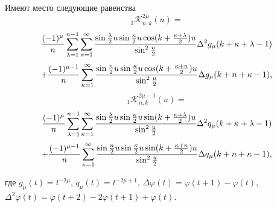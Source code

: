 \begin{lemma}\label{valle-pussen-l2.4} Имеют место следующие равенства
 $$
 _1\mathcal{ K}_{n,k}^{2\mu}(u)=
 $$
 $$
 {(-1)^\mu\over n}\sum\limits_{\lambda=1}^{n-1}
\sum\limits_{\kappa=1}^{\infty}\frac{\sin\frac{\lambda}{2}u\sin\frac{\kappa}{2}u
\cos(k+\frac{\kappa+\lambda}{2})u}{\sin^2\frac u2}\Delta^2g_\mu(k+\kappa+\lambda-1)
$$
 \begin{equation}\label{valle-pussen-2-2.23}
    +{(-1)^{\mu-1}\over n}\sum\limits_{\kappa=1}^{\infty}
\frac{\sin\frac {n}{2}u\sin\frac{\kappa}{2}u\cos(k+\frac{\kappa+n}{2})u}{\sin^2\frac u2}
\Delta g_\mu(k+n+\kappa-1),
 \end{equation}
 $$
 _1\mathcal{ K}_{n,k}^{2\mu-1}(u)=
 $$
 $$
 {(-1)^\mu\over n}\sum\limits_{\lambda=1}^{n-1}
\sum\limits_{\kappa=1}^{\infty}\frac{\sin\frac{\lambda}{2}u\sin\frac{\kappa}{2}u
\sin(k+\frac{\kappa+\lambda}{2})u}{\sin^2\frac u2}\Delta^2q_\mu(k+\kappa+\lambda-1)
$$
 \begin{equation}\label{valle-pussen-2-2.24}
    +{(-1)^{\mu-1}\over n}\sum\limits_{\kappa=1}^{\infty}
\frac{\sin\frac {n}{2}u\sin\frac{\kappa}{2}u\sin(k+\frac{\kappa+n}{2})u}{\sin^2\frac u2}
\Delta q_\mu(k+n+\kappa-1),
 \end{equation}



 где $g_\mu(t)=t^{-2\mu}$, $q_\mu(t)=t^{-2\mu+1}$, $\Delta\varphi(t)=\varphi(t+1)-\varphi(t)$,
 $\Delta^2\varphi(t)=\varphi(t+2)-2\varphi(t+1)+\varphi(t)$.
\end{lemma}

